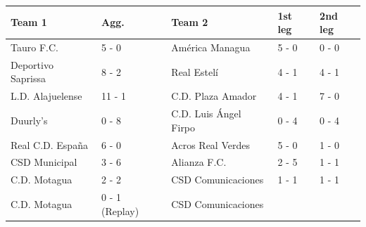 \documentclass{article}
\begin{document}
\begin{tabular}{lllll}
\toprule
Team 1 & Agg. & Team 2 & 1st leg & 2nd leg \\
\midrule
Tauro F.C. & 5 - 0 & América Managua & 5 - 0 & 0 - 0 \\
Deportivo Saprissa & 8 - 2 & Real Estelí & 4 - 1 & 4 - 1 \\
L.D. Alajuelense & 11 - 1 & C.D. Plaza Amador & 4 - 1 & 7 - 0 \\
Duurly's & 0 - 8 & C.D. Luis Ángel Firpo & 0 - 4 & 0 - 4 \\
Real C.D. España & 6 - 0 & Acros Real Verdes & 5 - 0 & 1 - 0 \\
CSD Municipal & 3 - 6 & Alianza F.C. & 2 - 5 & 1 - 1 \\
C.D. Motagua & 2 - 2 & CSD Comunicaciones & 1 - 1 & 1 - 1 \\
C.D. Motagua & 0 - 1 (Replay) & CSD Comunicaciones &  &  \\
\bottomrule
\end{tabular}
\end{document}
